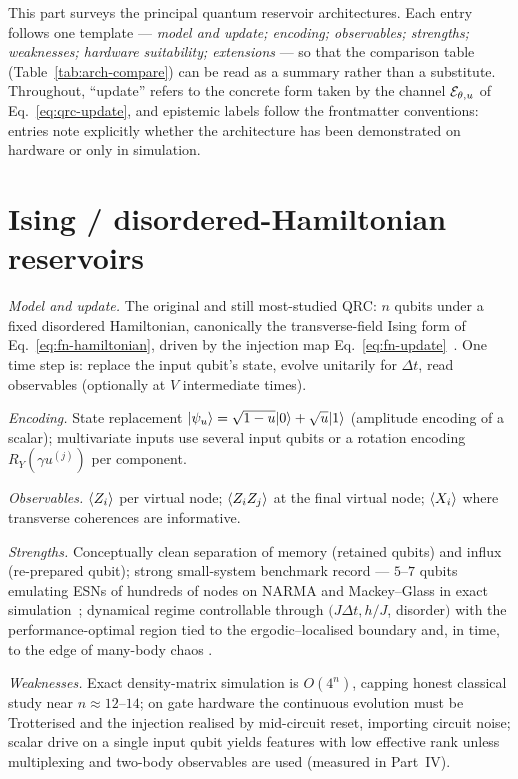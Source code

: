 
\noindent
This part surveys the principal quantum reservoir architectures. Each entry
follows one template --- \emph{model and update; encoding; observables;
strengths; weaknesses; hardware suitability; extensions} --- so that the
comparison table (Table~\ref{tab:arch-compare}) can be read as a summary
rather than a substitute. Throughout, ``update'' refers to the concrete form
taken by the channel $\mathcal{E}_{\theta,u}$ of Eq.~\eqref{eq:qrc-update}, and
epistemic labels follow the frontmatter conventions: entries note explicitly
whether the architecture has been demonstrated on hardware or only in
simulation.

\section{Ising / disordered-Hamiltonian reservoirs}
\label{sec:arch-ising}

\emph{Model and update.} The original and still most-studied QRC: $n$ qubits
under a fixed disordered Hamiltonian, canonically the transverse-field Ising
form of Eq.~\eqref{eq:fn-hamiltonian}, driven by the injection map
Eq.~\eqref{eq:fn-update}~\citep{fujii2017harnessing}. One time step is: replace
the input qubit's state, evolve unitarily for $\Delta t$, read observables
(optionally at $V$ intermediate times).

\emph{Encoding.} State replacement
$|\psi_u\rangle=\sqrt{1-u}|0\rangle+\sqrt{u}|1\rangle$ (amplitude encoding of a scalar);
multivariate inputs use several input qubits or a rotation encoding
$R_Y(\gamma u^{(j)})$ per component.

\emph{Observables.} $\langle Z_i\rangle$ per virtual node; $\langle Z_iZ_j\rangle$ at the final
virtual node; $\langle X_i\rangle$ where transverse coherences are informative.

\emph{Strengths.} Conceptually clean separation of memory (retained qubits)
and influx (re-prepared qubit); strong small-system benchmark record ---
$5$--$7$ qubits emulating ESNs of hundreds of nodes on NARMA and
Mackey--Glass in exact simulation~\citep{fujii2017harnessing,kutvonen2020optimizing};
dynamical regime controllable through $(J\Delta t, h/J$, disorder$)$ with the
performance-optimal region tied to the ergodic--localised boundary
\citep{martinez2021dynamical} and, in time, to the edge of many-body chaos
\citep{kobayashi2026edge}.

\emph{Weaknesses.} Exact density-matrix simulation is $O(4^n)$, capping
honest classical study near $n\!\approx\!12$--$14$; on gate hardware the
continuous evolution must be Trotterised and the injection realised by
mid-circuit reset, importing circuit noise; scalar drive on a single input
qubit yields features with low effective rank unless multiplexing and
two-body observables are used (measured in Part~IV).

